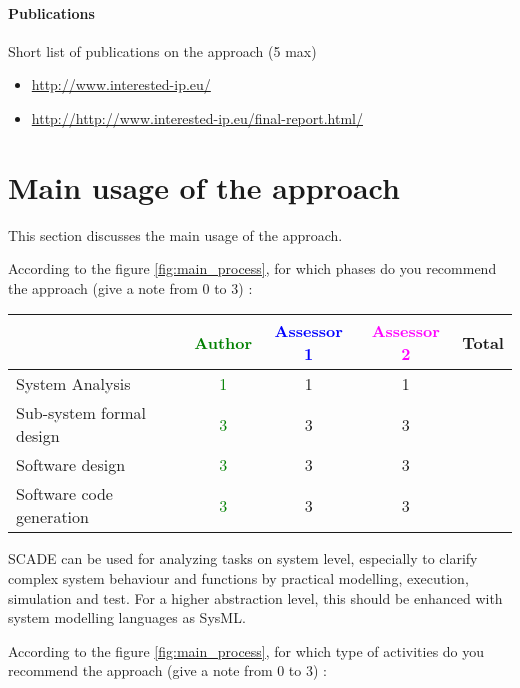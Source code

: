 \paragraph{Publications} Short list of publications on the approach (5 max)

\begin{itemize}
	\item \url{http://www.interested-ip.eu/}
  \item \url{http://http://www.interested-ip.eu/final-report.html/}

\end{itemize}

\section{Main usage of the approach}
\label{main_usage}
This section discusses the main usage of the approach.

According to the figure \ref{fig:main_process}, for which phases do you recommend the approach (give a note from 0 to  3) :

\begin{tabular}{|l | c | c | c | c|}
\hline
& \textcolor{green}{Author} & \textcolor{blue}{Assessor 1} & \textcolor{magenta}{Assessor 2} & Total \\
\hline 
System Analysis & \textcolor{green}{1}  & 1 &1 &  \\
\hline
Sub-system  formal  design &  \textcolor{green}{3} & 3 &3 & \\
\hline
Software design & \textcolor{green}{3}  & 3 & 3 & \\
\hline
Software code generation & \textcolor{green}{3} & 3 &3 & \\
\hline
\end{tabular}

\begin{author_comment}
SCADE can be used for analyzing tasks on system level, especially to clarify complex system behaviour and functions by practical modelling, execution, simulation and test. For a higher abstraction level, this should be enhanced with system modelling languages as SysML.
\end{author_comment}
According to the figure \ref{fig:main_process}, for which type of activities do you recommend the approach (give a note from 0 to  3) :

